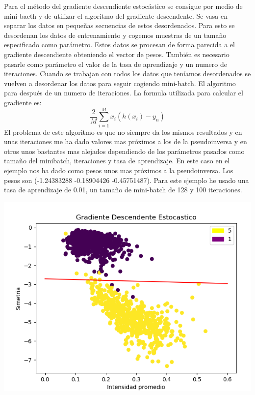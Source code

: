 \documentclass[titlepage]{article}
\begin{document}
 	Para el método del gradiente descendiente estocástico se consigue por medio de mini-bacth y de utilizar el algoritmo del gradiente descendente. Se vasa en separar los datos en pequeñas secuencias de estos desordenados. Para esto se desordenan los datos de entrenamiento y cogemos muestras de un tamaño especificado como parámetro. Estos datos se procesan de forma parecida a el gradiente descendiente obteniendo el vector de pesos. También es necesario pasarle como parámetro el valor de la tasa de aprendizaje y un numero de iteraciones. Cuando se trabajan con todos los datos que teníamos desordenados se vuelven a desordenar los datos para seguir cogiendo mini-batch. El algoritmo para después de un numero de iteraciones.
 	La formula utilizada para calcular el gradiente es:
 	\begin{equation}
 	\frac{2}{M}\sum_{i=1}^{M}x_{i}(h(x_{i}) - y_{n})
 	\end{equation}
 	El problema de este algoritmo es que no siempre da los mismos resultados y en unas iteraciones me ha dado valores mas próximos a los de la pseudoinversa y en otros unos bastantes mas alejados dependiendo de los parámetros pasados como tamaño del minibatch, iteraciones y tasa de aprendizaje.
	En este caso en el ejemplo nos ha dado como pesos unos mas próximos a la pseudoinversa. Los pesos son (-1.24383288 -0.18904426 -0.45751487). Para este ejemplo he usado una tasa de aprendizaje de 0.01, un tamaño de mini-batch de 128 y 100 iteraciones.
	
	\begin{center}
		\includegraphics[scale=0.5]{gde.png}
	\end{center}
	
\end{document}
